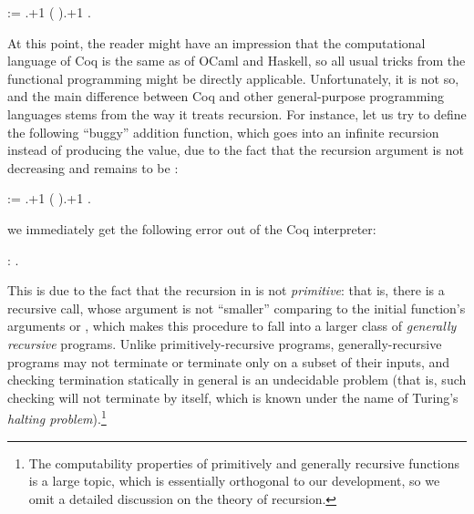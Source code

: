 \begin{coqdoccode}
\coqdocemptyline
\coqdocnoindent
{}    :=    .+1  (  ).+1  .\coqdoceol
\coqdocemptyline
\end{coqdoccode}


At this point, the reader might have an impression that the
computational language of Coq is the same as of OCaml and Haskell, so
all usual tricks from the functional programming might be directly
applicable. Unfortunately, it is not so, and the main difference
between Coq and other general-purpose programming languages stems from
the way it treats recursion. For instance, let us try to define the
following ``buggy'' addition function, which goes into an infinite
recursion instead of producing the value, due to the fact that the
recursion argument is not decreasing and remains to be :


\coqdoceol
\coqdocemptyline
\coqdocnoindent
{}    := \coqdoceol
\coqdocindent{2.00em}
   .+1  (  ).+1  .

\coqdocemptyline


we immediately get the following error out of the Coq interpreter:


\coqdoceol
\coqdocemptyline
\coqdocnoindent
{}:      .

\coqdocemptyline


This is due to the fact that the recursion in  is not
\textit{primitive}: that is, there is a recursive call, whose argument is not
``smaller'' comparing to the initial function's arguments  or ,
which makes this procedure to fall into a larger class of \textit{generally
recursive} programs. Unlike primitively-recursive programs,
generally-recursive programs may not terminate or terminate only on a
subset of their inputs, and checking termination statically in general
is an undecidable problem (that is, such checking will not terminate
by itself, which is known under the name of Turing's \textit{halting
problem}).\footnote{The computability properties of primitively and
generally recursive functions is a large topic, which is essentially
orthogonal to our development, so we omit a detailed discussion on the
theory of recursion.}


